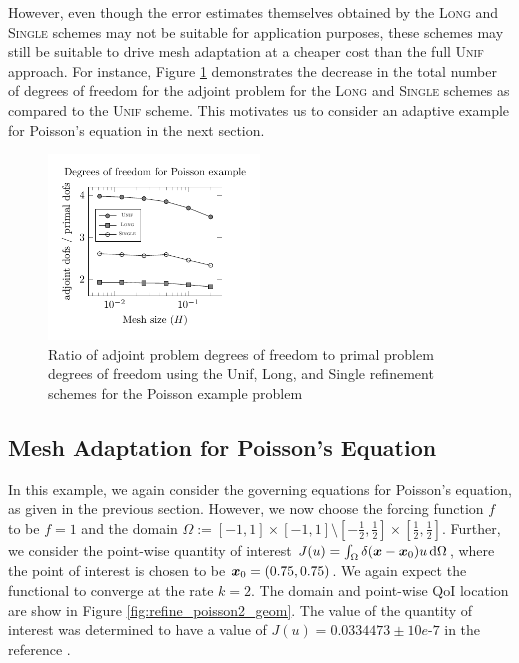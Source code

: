 However, even though the error estimates themselves obtained by
the \textsc{Long} and \textsc{Single} schemes may not be suitable
for application purposes, these schemes may still be suitable to
drive mesh adaptation at a cheaper cost than the full \textsc{Unif}
approach. For instance, Figure \ref{fig:refine_poisson_dofs}
demonstrates the decrease in the total number of degrees of
freedom for the adjoint problem for the \textsc{Long} and \textsc{Single}
schemes as compared to the \textsc{Unif} scheme. This motivates
us to consider an adaptive example for Poisson's equation in the
next section.

%
\begin{figure}[ht!]
\centering
\includegraphics[width=0.5\textwidth]{img/refine_poisson_dofs}
\caption{Ratio of adjoint problem degrees of freedom to primal
problem degrees of freedom using the Unif,
Long, and Single refinement schemes
for the Poisson example problem}
\label{fig:refine_poisson_dofs}
\end{figure}

\subsection{Mesh Adaptation for Poisson's Equation}

In this example, we again consider the governing equations for Poisson's
equation, as given in the previous section. However, we now choose the
forcing function $f$ to be $f=1$ and the domain
$\Omega := [-1,1] \times [-1,1] \setminus
[-\frac12, \frac12] \times [\frac12, \frac12]$. Further, we consider
the point-wise quantity of interest
$J(u) = \int_{\Omega} \delta(\boldsymbol{x} - \boldsymbol{x}_0) u \, \text{d} \Omega$,
where the point of interest is chosen to be
$\boldsymbol{x}_0 = (0.75, 0.75)$. We again expect the functional to converge
at the rate $k = 2$. The domain and point-wise QoI location are show
in Figure \ref{fig:refine_poisson2_geom}. The value of the quantity
of interest was determined to have a value of $J(u) = 0.0334473
\pm 10e\mbox{-}7$ in the reference \cite{dealiistep14}.

